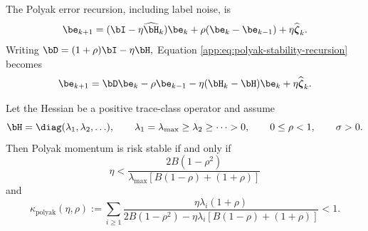 \documentclass[11pt]{article}
\newcommand{\polyak}{\mathrm{polyak}}
\begin{document}
The Polyak error recursion, including label noise, is
\begin{equation}
\label{app:eq:polyak-stability-recursion}
\be_{k+1}
=
(\bI-\eta\widehat{\bH}_k)\be_k
+
\rho(\be_k-\be_{k-1})
+
\eta\widehat{\boldsymbol\zeta}_k.
\end{equation}
Writing
\(\bD=(1+\rho)\bI-\eta\bH,\)
Equation \eqref{app:eq:polyak-stability-recursion} becomes
\[
\be_{k+1}
=
\bD\be_k
-
\rho\be_{k-1}
-
\eta({\bH}_k-\bH)\be_k
+
\eta\widehat{\boldsymbol\zeta}_k.
\]

\begin{theorem}
\label{app:thm:polyak-stability}
Let the Hessian be a positive trace-class operator and assume
\[
\bH=\diag(\lambda_1,\lambda_2,\ldots),
\qquad
\lambda_1=\lambda_{\max}\geq\lambda_2\geq\cdots>0,
\qquad
0\leq\rho<1,
\qquad
\sigma>0.
\]
Then Polyak momentum is risk stable if and only if
\begin{equation}
\label{app:eq:polyak-local-stability}
\eta
<
\frac{
2B(1-\rho^2)
}{
\lambda_{\max}\left[B(1-\rho)+(1+\rho)\right]
}
\end{equation}
and
\begin{equation}
\label{app:eq:polyak-global-stability}
\kappa_{\polyak}(\eta,\rho)
:=
\sum_{i\geq1}
\frac{
\eta\lambda_i(1+\rho)
}{
2B(1-\rho^2)
-
\eta\lambda_i\left[B(1-\rho)+(1+\rho)\right]
}
<1.
\end{equation}
\end{theorem}
\end{document}

